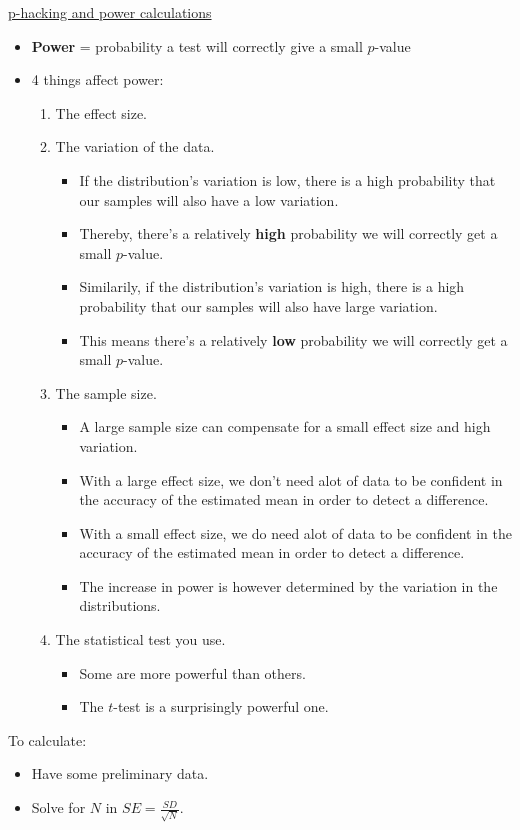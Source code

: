 \documentclass[12pt, titlepage, french]{report}
\begin{document}
\begin{YTB_SUMM_AUTO_NUMB}[label = {SQ-Phack-power}]{\href{https://www.youtube.com/watch?v=UFhJefdVCjE}{p-hacking and power calculations}}
\begin{itemize}
	\item	\textbf{Power} = probability a test will correctly give a small $p$-value
	\item	4 things affect power:
		\begin{enumerate}
		\item	The effect size.
		\item	The variation of the data.
			\begin{itemize}
			\item	If the distribution's variation is low, there is a high probability that our samples will also have a low variation.
			\item	Thereby, there's a relatively \textbf{high} probability we will correctly get a small $p$-value.
			\item	Similarily, if the distribution's variation is high, there is a high probability that our samples will also have large variation.
			\item	This means there's a relatively \textbf{low} probability we will correctly get a small $p$-value.
			\end{itemize}
		\item	The sample size.
			\begin{itemize}
			\item	A large sample size can compensate for a small effect size and high variation.
			\item	With a large effect size, we don't need alot of data to be confident in the accuracy of the estimated mean in order to detect a difference.
			\item	With a small effect size, we do need alot of data to be confident in the accuracy of the estimated mean in order to detect a difference.
			\item	The increase in power is however determined by the variation in the distributions.
			\end{itemize}
		\item	The statistical test you use.
			\begin{itemize}
			\item	Some are more powerful than others.
			\item	The $t$-test is a surprisingly powerful one.
			\end{itemize}
		\end{enumerate}
\end{itemize}

To calculate:
\begin{itemize}
	\item	Have some preliminary data.
	\item	Solve for $N$ in $SE	=	\frac{SD}{\sqrt{N}}$.
\end{itemize}
\end{YTB_SUMM_AUTO_NUMB}
\end{document}
